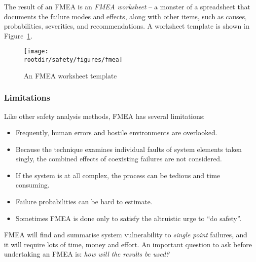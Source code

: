 The result of an FMEA is an \emph{FMEA worksheet} -- a monster of a spreadsheet that documents the failure modes and effects, along with other items, such as causes, probabilities, severities, and recommendations. A worksheet template is shown in Figure~\ref{fig:safety:fmea-worksheet}.

\begin{figure}[!h]
 \centering
  \begin{sideways}
  \centering
  \texttt{[image: \\rootdir/safety/figures/fmea]}
  \end{sideways}
  \caption{An FMEA worksheet template}
  \label{fig:safety:fmea-worksheet}
\end{figure}
  

\subsubsection*{Limitations}

Like other safety analysis methods, FMEA has several limitations:

  \begin{itemize}

    \item Frequently, human errors and hostile environments are overlooked.

    \item Because the technique examines individual faults of system  elements taken singly, the combined effects of coexisting  failures are not considered.

    \item If the system is at all complex, the process can be tedious and time consuming.

    \item Failure probabilities can be hard to estimate.

    \item Sometimes FMEA is done only to satisfy the altruistic urge  to ``do safety''. 

  \end{itemize}

FMEA will find and summarise system vulnerability to \emph{single point} failures, and it will require lots of time, money and effort. An important question to ask before undertaking an FMEA is: \emph{how will the results be used?}
  

